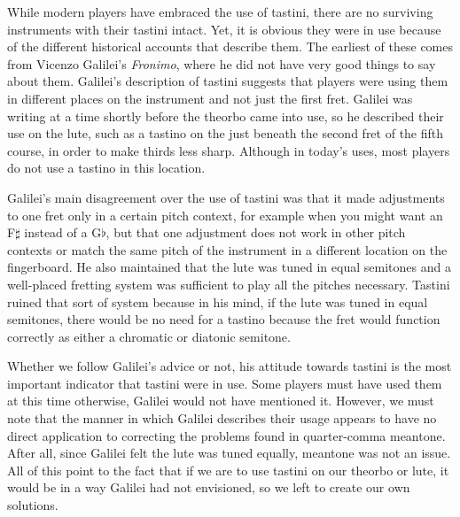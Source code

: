While modern players have embraced the use of tastini, there are no surviving instruments
with their tastini intact.  Yet, it is obvious they were in use because of the different
historical accounts that describe them.  The earliest of these comes from Vicenzo
Galilei's \textit{Fronimo}, where he did not have very good things to say about them.
Galilei's description of tastini suggests that players were using them in different places
on the instrument and not just the first fret.  Galilei was writing at a time shortly
before the theorbo came into use, so he described their use on the lute, such as a tastino
on the just beneath the second fret of the fifth course, in order to make thirds less
sharp.\autocite[165]{VG:1}  Although in today's uses, most players do not use a tastino in this
location.

Galilei's main disagreement over the use of tastini was that it made adjustments to one
fret only in a certain pitch context, for example when you might want an F$\sharp$ instead
of a G$\flat$, but that one adjustment does not work in other pitch contexts or match the
same pitch of the instrument in a different location on the fingerboard.  He also
maintained that the lute was tuned in equal semitones and a well-placed fretting system
was sufficient to play all the pitches necessary. Tastini ruined that sort of system
because in his mind, if the lute was tuned in equal semitones, there would be no need for
a tastino because the fret would function correctly as either a chromatic or diatonic
semitone.

Whether we follow Galilei's advice or not, his attitude towards tastini is the most
important indicator that tastini were in use.  Some players must have used them at this
time otherwise, Galilei would not have mentioned it.  However, we must note that the
manner in which Galilei describes their usage appears to have no direct application to
correcting the problems found in quarter-comma meantone.  After all, since Galilei felt
the lute was tuned equally, meantone was not an issue.  All of this point to the fact
that if we are to use tastini on our theorbo or lute, it would be in a way Galilei had
not envisioned, so we left to create our own solutions.

